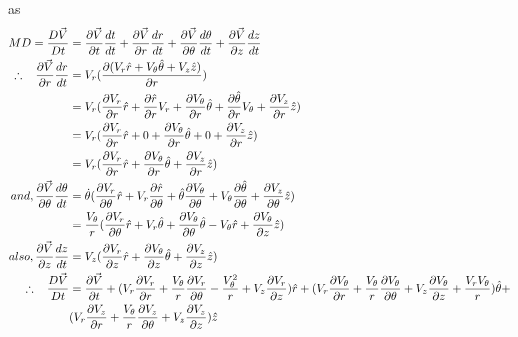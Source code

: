 \documentclass{book}
\begin{document}
as\begin{equation*}
\begin{split} MD=\frac{D\vec{V}}{Dt}&=\frac{\partial \vec{V}}{\partial t}\frac{dt}{dt}+\frac{\partial \vec{V}}{\partial r}\frac{dr}{dt}+\frac{\partial \vec{V}}{\partial \theta}\frac{d\theta}{dt}+\frac{\partial \vec{V}}{\partial z}\frac{dz}{dt}\\
\therefore\hspace{0.3cm}\frac{\partial\vec{V}}{\partial r}\frac{dr}{dt}&=V_r(\frac{\partial (V_r\hat{r}+V_\theta\hat{\theta}+V_z\hat{z})}{\partial r})\\
&=V_r(\frac{\partial V_r}{\partial r}\hat{r}+\frac{\partial \hat{r}}{\partial r}V_r+\frac{\partial V_\theta}{\partial r}\hat{\theta}+\frac{\partial \hat{\theta}}{\partial r}V_\theta+\frac{\partial V_z}{\partial r}\hat{z})\\
&=V_r(\frac{\partial V_r}{\partial r}\hat{r}+0+\frac{\partial V_\theta}{\partial r}\hat{\theta}+0+\frac{\partial V_z}{\partial r}\hat{z})\\
&=V_r(\frac{\partial V_r}{\partial r}\hat{r}+\frac{\partial V_\theta}{\partial r}\hat{\theta}+\frac{\partial V_z}{\partial r}\hat{z})\\
and, \frac{\partial\vec{V}}{\partial \theta}\frac{d\theta}{dt}&=\dot{\theta}(\frac{\partial V_r}{\partial \theta}\hat{r}+V_r\frac{\partial \hat{r}}{\partial \theta}+\hat{\theta}\frac{\partial V_\theta}{\partial \theta}+V_\theta\frac{\partial \hat{\theta}}{\partial \theta}+\frac{\partial V_z}{\partial \theta}\hat{z})\\
&=\frac{V_\theta}{r}(\frac{\partial V_r}{\partial \theta}\hat{r}+V_r\hat{\theta}+\frac{\partial V_\theta}{\partial \theta}\hat{\theta}-V_\theta\hat{r}+\frac{\partial V_\theta}{\partial z}\hat{z})\\
also,  \frac{\partial\vec{V}}{\partial z}\frac{dz}{dt}&=V_z(\frac{\partial V_r}{\partial z}\hat{r}+\frac{\partial V_\theta}{\partial z}\hat{\theta}+\frac{\partial V_z }{\partial z}\hat{z})\\
\therefore\hspace{0.3cm}\frac{D\vec{V}}{Dt}&=\frac{\partial \vec{V}}{\partial t}+(V_r\frac{\partial V_r}{\partial r}+\frac{V_\theta}{r}\frac{\partial V_r}{\partial \theta}-\frac{V_\theta^2}{r}+V_z\frac{\partial V_r}{\partial z})\hat{r}+(V_r\frac{\partial V_\theta}{\partial r}+\frac{V_\theta}{r}\frac{\partial V_\theta}{\partial \theta}+V_z\frac{\partial V_\theta}{\partial z}+\frac{V_r V_\theta}{r})\hat{\theta}+  \\&  (V_r\frac{\partial V_z}{\partial r}+\frac{V_\theta}{r}\frac{\partial V_z}{\partial \theta}+V_z\frac{\partial V_z}{\partial z})\hat{z}\\
\end{split}
\end{equation*}
\end{document}
